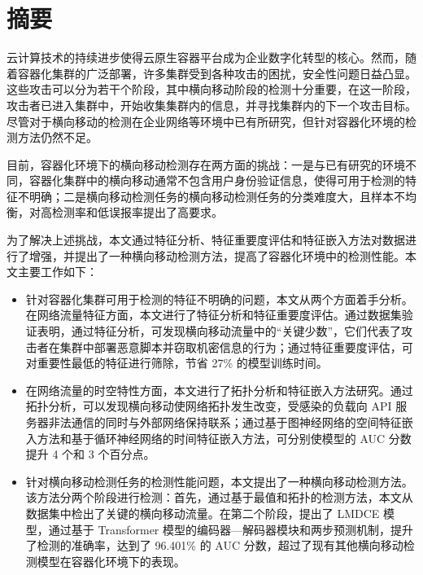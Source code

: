 
\maketitle%
\MAKETITLE%
\makedeclaration%
\intobmk\chapter*{摘\quad 要}%
\setcounter{page}{1}%

云计算技术的持续进步使得云原生容器平台成为企业数字化转型的核心。然而，随着容器化集群的广泛部署，许多集群受到各种攻击的困扰，安全性问题日益凸显。这些攻击可以分为若干个阶段，其中横向移动阶段的检测十分重要，在这一阶段，攻击者已进入集群中，开始收集集群内的信息，并寻找集群内的下一个攻击目标。尽管对于横向移动的检测在企业网络等环境中已有所研究，但针对容器化环境的检测方法仍然不足。

目前，容器化环境下的横向移动检测存在两方面的挑战：一是与已有研究的环境不同，容器化集群中的横向移动通常不包含用户身份验证信息，使得可用于检测的特征不明确；二是横向移动检测任务的横向移动检测任务的分类难度大，且样本不均衡，对高检测率和低误报率提出了高要求。

为了解决上述挑战，本文通过特征分析、特征重要度评估和特征嵌入方法对数据进行了增强，并提出了一种横向移动检测方法，提高了容器化环境中的检测性能。本文主要工作如下：

\begin{itemize}
    \item 针对容器化集群可用于检测的特征不明确的问题，本文从两个方面着手分析。在网络流量特征方面，本文进行了特征分析和特征重要度评估。通过数据集验证表明，通过特征分析，可发现横向移动流量中的``关键少数''，它们代表了攻击者在集群中部署恶意脚本并窃取机密信息的行为；通过特征重要度评估，可对重要性最低的特征进行筛除，节省 27\% 的模型训练时间。
    \item 在网络流量的时空特性方面，本文进行了拓扑分析和特征嵌入方法研究。通过拓扑分析，可以发现横向移动使网络拓扑发生改变，受感染的负载向 API 服务器非法通信的同时与外部网络保持联系；通过基于图神经网络的空间特征嵌入方法和基于循环神经网络的时间特征嵌入方法，可分别使模型的 AUC 分数提升 4 个和 3 个百分点。
    \item 针对横向移动检测任务的检测性能问题，本文提出了一种横向移动检测方法。该方法分两个阶段进行检测：首先，通过基于最值和拓扑的检测方法，本文从数据集中检出了关键的横向移动流量。在第二个阶段，提出了 LMDCE 模型，通过基于 Transformer 模型的编码器—解码器模块和两步预测机制，提升了检测的准确率，达到了 96.401\% 的 AUC 分数，超过了现有其他横向移动检测模型在容器化环境下的表现。
\end{itemize}

